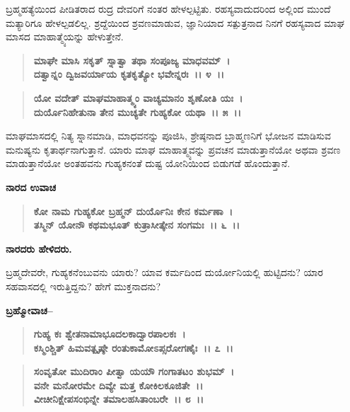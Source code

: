 ಬ್ರಹ್ಮಹತ್ಯೆಯಿಂದ ಪೀಡಿತರಾದ ರುದ್ರ ದೇವರಿಗೆ ನಂತರ ಹೇಳಲ್ಪಟ್ಟಿತು. ರಹಸ್ಯವಾದುದರಿಂದ ಅಲ್ಲಿಂದ ಮುಂದೆ ಮತ್ಯಾರಿಗೂ ಹೇಳಲ್ಪಡಲಿಲ್ಲ. ಶ್ರದ್ದೆಯಿಂದ ಶ್ರವಣಮಾಡುವ, ಜ್ಞಾನಿಯಾದ ಸತ್ಪುತ್ರನಾದ ನಿನಗೆ ರಹಸ್ಯವಾದ ಮಾಘ ಮಾಸದ ಮಾಹಾತ್ಮ್ಯೆಯನ್ನು ಹೇಳುತ್ತೇನೆ.

\begin{verse}
\textbf{ಮಾಘೇ ಮಾಸಿ ಸಕೃತ್ ಸ್ನಾತ್ವಾ ತಥಾ ಸಂಪೂಜ್ಯ ಮಾಧವಮ್~।}\\\textbf{ದತ್ವಾನ್ನಂ ದ್ವಿಜವರ್ಯಾಯ ಕೃತಕೃತ್ಯೋ ಭವೇನ್ನರಃ~।। ೪~।। }
\end{verse}

\begin{verse}
\textbf{ಯೋ ವದೇತ್ ಮಾಘಮಾಹಾತ್ಮ್ಯಂ ವಾಚ್ಯಮಾನಂ ಶೃಣೋತಿ ಯಃ~।}\\\textbf{ದುರ್ಯೊನಿಹೇತುನಾ ತೇನ ಮುಚ್ಯತೇ ಗುಹ್ಯಕೋ ಯಥಾ~।। ೫~।।}
\end{verse}

ಮಾಘಮಾಸದಲ್ಲಿ ನಿತ್ಯ ಸ್ನಾನಮಾಡಿ, ಮಾಧವನನ್ನು ಪೂಜಿಸಿ, ಶ್ರೇಷ್ಠನಾದ ಬ್ರಾಹ್ಮಣನಿಗೆ ಭೋಜನ ಮಾಡಿಸುವ ಮನುಷ್ಯನು ಕೃತಾರ್ಥನಾಗುತ್ತಾನೆ. ಯಾರು ಮಾಘ ಮಾಹಾತ್ಮ್ಯವನ್ನು ಪ್ರವಚನ ಮಾಡುತ್ತಾನೆಯೋ ಅಥವಾ ಶ್ರವಣ ಮಾಡುತ್ತಾನೆಯೋ ಅಂತಹವನು ಗುಹ್ಯಕನಂತೆ ದುಷ್ಟ ಯೋನಿಯಿಂದ ಬಿಡುಗಡೆ ಹೊಂದುತ್ತಾನೆ.

\begin{flushleft}
\textbf{ನಾರದ ಉವಾಚ}
\end{flushleft}

\begin{verse}
\textbf{ಕೋ ನಾಮ ಗುಹ್ಯಕೋ ಬ್ರಹ್ಮನ್ ದುರ್ಯೊನಿಃ ಕೇನ ಕರ್ಮಣಾ~।}\\\textbf{ತಸ್ಮಿನ್ ಯೋನೌ ಕಥಮಭೂತ್ ಕುತ್ರಾಸೀತ್ಕೇನ ಸಂಗಮಃ~।। ೬~।।}
\end{verse}

\begin{flushleft}
\textbf{ನಾರದರು ಹೇಳಿದರು.}
\end{flushleft}

ಬ್ರಹ್ಮದೇವರೇ, ಗುಹ್ಯಕನೆಂಬುವನು ಯಾರು? ಯಾವ ಕರ್ಮದಿಂದ ದುರ್ಯೋನಿಯಲ್ಲಿ ಹುಟ್ಟಿದನು? ಯಾರ ಸಹವಾಸದಲ್ಲಿ ಇರುತ್ತಿದ್ದನು? ಹೇಗೆ ಮುಕ್ತನಾದನು?

\begin{flushleft}
\textbf{ಬ್ರಹ್ಮೋವಾಚ–}
\end{flushleft}

\begin{verse}
\textbf{ಗುಹ್ಯ ಕಃ ಶ್ವೇತನಾಮಾಭೂದಲಕಾದ್ವಾರಪಾಲಕಃ~।}\\\textbf{ಕಸ್ಮಿಂಶ್ಚಿತ್ ಹಿಮವತ್ಪೃಷ್ಠೇ ರಂತುಕಾಮೋಽಪ್ಸರೋಗಣೈಃ~।। ೭~।। }
\end{verse}

\begin{verse}
\textbf{ಸಂವೃತೋ ಮುದಿರಾಂ ಪೀತ್ವಾ ಯಯೌ ಗಂಗಾತಟಂ ಶುಭಮ್~।}\\\textbf{ವನೇ ಮನೋರಮೇ ದಿವ್ಯೇ ಮತ್ತ ಕೋಕಿಲಕೂಜಿತೇ~।।}\\\textbf{ವೀಚೀನಿಕ್ಷೇಪಸಂಭಿನ್ನೇ ತಮಾಲಹಸಿತಾಂಬರೇ~।। ೮~।।}
\end{verse}

